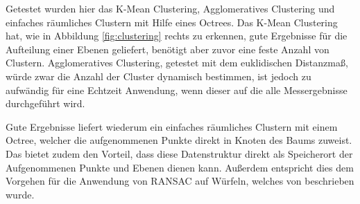 Getestet wurden hier das K-Mean Clustering, Agglomeratives Clustering und einfaches räumliches Clustern mit Hilfe eines Octrees. Das K-Mean Clustering hat, wie in Abbildung \ref{fig:clustering} rechts zu erkennen, gute Ergebnisse für die Aufteilung einer Ebenen geliefert, benötigt aber zuvor eine feste Anzahl von Clustern. Agglomeratives Clustering, getestet mit dem euklidischen Distanzmaß, würde zwar die Anzahl der Cluster dynamisch bestimmen, ist jedoch zu aufwändig für eine Echtzeit Anwendung, wenn dieser auf die alle Messergebnisse durchgeführt wird. 

Gute Ergebnisse liefert wiederum ein einfaches räumliches Clustern mit einem Octree, welcher die aufgenommenen Punkte direkt in Knoten des Baums zuweist. Das bietet zudem den Vorteil, dass diese Datenstruktur direkt als Speicherort der Aufgenommenen Punkte und Ebenen dienen kann. Außerdem entspricht dies dem Vorgehen für die Anwendung von RANSAC auf Würfeln, welches von \citet{yang2010plane} beschrieben wurde. 
